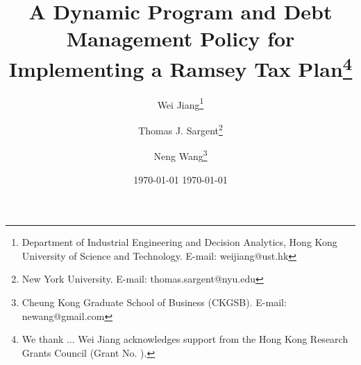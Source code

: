 \documentclass[12pt]{article}
\newcommand{\NW}[1]{{\textcolor{blue}{#1}}}
\begin{document}
\date{%
\today%
}
\title{A Dynamic Program and Debt Management Policy for Implementing a Ramsey Tax Plan\thanks{We thank $\ldots$  
Wei Jiang acknowledges support from the Hong Kong Research Grants Council (Grant No. ).}}  %
\date{\today}
\author{	 Wei Jiang\thanks{%
Department of Industrial Engineering and Decision Analytics, Hong Kong University of Science and Technology. E-mail: weijiang@ust.hk } \and Thomas J. Sargent\thanks{New York University. E-mail: thomas.sargent@nyu.edu} \and Neng Wang\thanks{Cheung Kong Graduate School of Business (CKGSB). E-mail: {newang@gmail.com}} }

\maketitle
%

\newpage 
\end{document}
